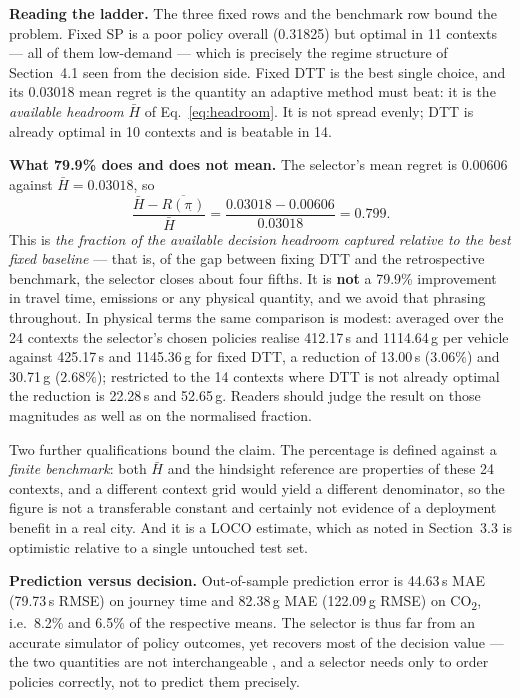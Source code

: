 \documentclass[10pt,a4paper]{article}
\newcommand{\CO}{CO\textsubscript{2}}
\begin{document}
\textbf{Reading the ladder.} The three fixed rows and the benchmark row bound the problem. Fixed SP is a poor policy overall (0.31825) but optimal in 11 contexts --- all of them low-demand --- which is precisely the regime structure of Section~4.1 seen from the decision side. Fixed DTT is the best single choice, and its 0.03018 mean regret is the quantity an adaptive method must beat: it is the \emph{available headroom} $\bar H$ of Eq.~\eqref{eq:headroom}. It is not spread evenly; DTT is already optimal in 10 contexts and is beatable in 14.

\textbf{What 79.9\% does and does not mean.} The selector's mean regret is 0.00606 against $\bar H=0.03018$, so
\[
\frac{\bar H-\overline{R(\pi_{\widehat{}})}}{\bar H}=\frac{0.03018-0.00606}{0.03018}=0.799 .
\]
This is \emph{the fraction of the available decision headroom captured relative to the best fixed baseline} --- that is, of the gap between fixing DTT and the retrospective benchmark, the selector closes about four fifths. It is \textbf{not} a 79.9\% improvement in travel time, emissions or any physical quantity, and we avoid that phrasing throughout. In physical terms the same comparison is modest: averaged over the 24 contexts the selector's chosen policies realise 412.17\,s and 1114.64\,g per vehicle against 425.17\,s and 1145.36\,g for fixed DTT, a reduction of 13.00\,s ($3.06\%$) and 30.71\,g ($2.68\%$); restricted to the 14 contexts where DTT is not already optimal the reduction is 22.28\,s and 52.65\,g. Readers should judge the result on those magnitudes as well as on the normalised fraction.

Two further qualifications bound the claim. The percentage is defined against a \emph{finite benchmark}: both $\bar H$ and the hindsight reference are properties of these 24 contexts, and a different context grid would yield a different denominator, so the figure is not a transferable constant and certainly not evidence of a deployment benefit in a real city. And it is a LOCO estimate, which as noted in Section~3.3 is optimistic relative to a single untouched test set.

\textbf{Prediction versus decision.} Out-of-sample prediction error is 44.63\,s MAE (79.73\,s RMSE) on journey time and 82.38\,g MAE (122.09\,g RMSE) on \CO, i.e.\ 8.2\% and 6.5\% of the respective means. The selector is thus far from an accurate simulator of policy outcomes, yet recovers most of the decision value --- the two quantities are not interchangeable \cite{R11}, and a selector needs only to order policies correctly, not to predict them precisely.
\end{document}
